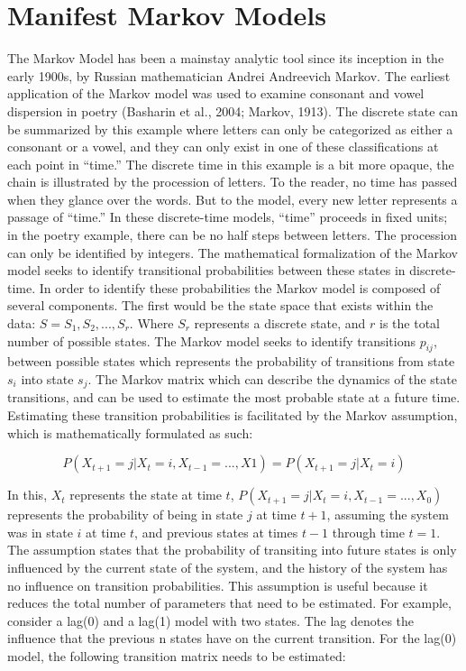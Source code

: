 \documentclass[12pt]{./styles/outhesis}
\begin{document}
\section{Manifest Markov Models}
The Markov Model has been a mainstay analytic tool since its inception
in the early 1900s, by Russian mathematician Andrei Andreevich Markov.
The earliest application of the Markov model was used to examine
consonant and vowel dispersion in poetry (Basharin et al., 2004; Markov,
1913). The discrete state can be summarized by this example where
letters can only be categorized as either a consonant or a vowel, and
they can only exist in one of these classifications at each point in
``time.'' The discrete time in this example is a bit more opaque, the
chain is illustrated by the procession of letters. To the reader, no
time has passed when they glance over the words. But to the model, every
new letter represents a passage of ``time.'' In these discrete-time
models, ``time'' proceeds in fixed units; in the poetry example, there
can be no half steps between letters. The procession can only be
identified by integers. The mathematical formalization of the Markov
model seeks to identify transitional probabilities between these states
in discrete-time. In order to identify these probabilities the Markov
model is composed of several components. The first would be the state
space that exists within the data: \(S={S_1, S_2, ..., S_r}\). Where
\(S_r\) represents a discrete state, and \(r\) is the total number of
possible states. The Markov model seeks to identify transitions
\(p_{ij}\), between possible states which represents the probability of
transitions from state \(s_i\) into state \(s_j\). The Markov matrix
which can describe the dynamics of the state transitions, and can be
used to estimate the most probable state at a future time. Estimating
these transition probabilities is facilitated by the Markov assumption,
which is mathematically formulated as such:

\[P(X_{t+1}= j | X_{t} = i, X_{t-1} = ..., X1) = P(X_{t+1} = j | X_t = i)\]

In this, \(X_t\) represents the state at time \(t\),
\(P(X_{t+1} = j | X_t = i, X_{t-1} = ..., X_0)\) represents the
probability of being in state \(j\) at time \(t + 1\), assuming the
system was in state \(i\) at time \(t\), and previous states at times
\(t-1\) through time \(t = 1\). The assumption states that the
probability of transiting into future states is only influenced by the
current state of the system, and the history of the system has no
influence on transition probabilities. This assumption is useful because
it reduces the total number of parameters that need to be estimated. For
example, consider a lag(0) and a lag(1) model with two states. The lag
denotes the influence that the previous n states have on the current
transition. For the lag(0) model, the following transition matrix needs
to be estimated:
\end{document}
